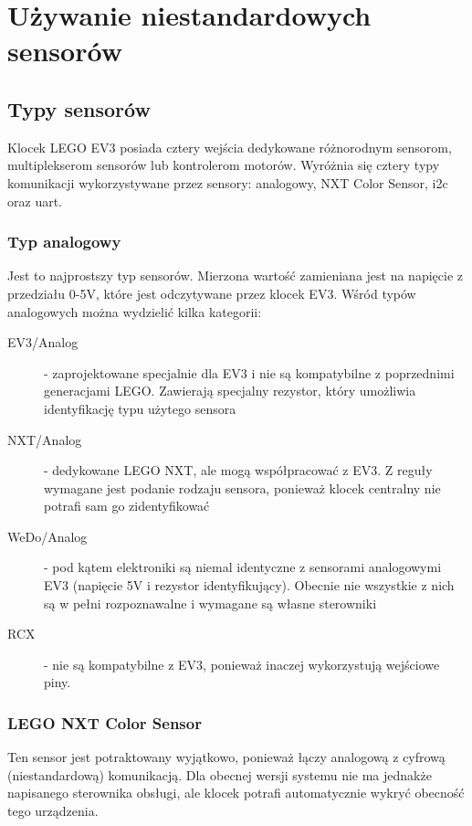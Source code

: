 \section{Używanie niestandardowych sensorów}
\label{app:other_sensors}

\subsection{Typy sensorów}

Klocek LEGO EV3 posiada cztery wejścia dedykowane różnorodnym sensorom, multiplekserom sensorów lub kontrolerom motorów. Wyróżnia się cztery typy komunikacji wykorzystywane przez sensory: analogowy, NXT Color Sensor, \Gls{i2c} oraz \Gls{uart}.

\subsubsection{Typ analogowy}

Jest to najprostszy typ sensorów. Mierzona wartość zamieniana jest na napięcie z przedziału 0-5V, które jest odczytywane przez klocek EV3. Wśród typów analogowych można wydzielić kilka kategorii:
\begin{description}
    \item[EV3/Analog]- zaprojektowane specjalnie dla EV3 i nie są kompatybilne z poprzednimi generacjami LEGO. Zawierają specjalny rezystor, który umożliwia identyfikację typu użytego sensora
    \item[NXT/Analog]- dedykowane LEGO NXT, ale mogą współpracować z EV3. Z reguły wymagane jest podanie rodzaju sensora, ponieważ klocek centralny nie potrafi sam go zidentyfikować
    \item[WeDo/Analog]- pod kątem elektroniki są niemal identyczne z sensorami analogowymi EV3 (napięcie 5V i rezystor identyfikujący). Obecnie nie wszystkie z nich są w pełni rozpoznawalne i wymagane są własne sterowniki
    \item[RCX]- nie są kompatybilne z EV3, ponieważ inaczej wykorzystują wejściowe piny.
\end{description}

\subsubsection{LEGO NXT Color Sensor}

Ten sensor jest potraktowany wyjątkowo, ponieważ łączy analogową z cyfrową (niestandardową) komunikacją. Dla obecnej wersji systemu nie ma jednakże napisanego sterownika obsługi, ale klocek potrafi automatycznie wykryć obecność tego urządzenia.

